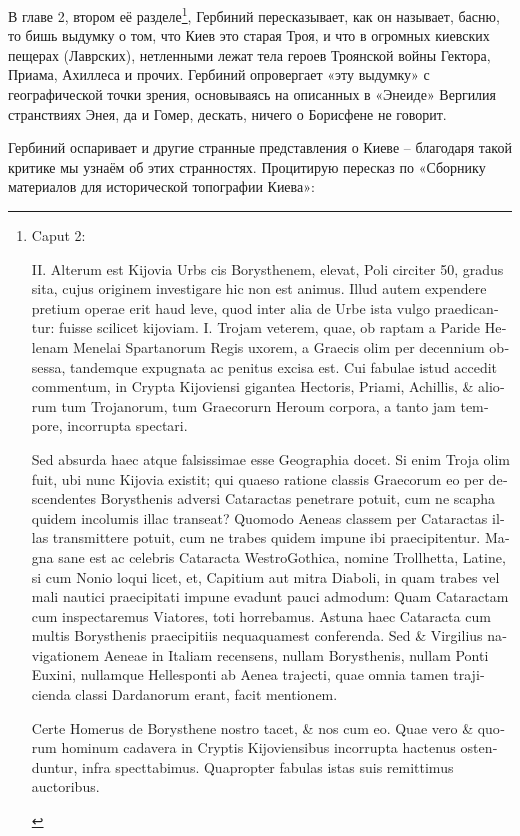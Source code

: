 В главе 2, втором её разделе\footnote{\begin{otherlanguage}{latin}Caput 2:

II.
Alterum est Kijovia Urbs cis Borysthenem, elevat, Poli circiter 50, gradus sita, cujus originem investigare hic non est animus. Illud autem expendere pretium operae erit haud leve, quod inter alia de Urbe ista vulgo praedicantur: fuisse scilicet kijoviam. I. Trojam veterem, quae, ob raptam a Paride Helenam Menelai Spartanorum Regis uxorem, a Graecis olim per decennium obsessa, tandemque expugnata ac penitus excisa est. Cui fabulae istud accedit commentum, in Crypta Kijoviensi gigantea Hectoris, Priami, Achillis, \& aliorum tum Trojanorum, tum Graecorurn Heroum corpora, a tanto jam tempore, incorrupta spectari. 

Sed absurda haec atque falsissimae esse Geographia docet. Si enim Troja olim fuit, ubi nunc Kijovia existit; qui quaeso ratione classis Graecorum eo per descendentes Borysthenis adversi Cataractas penetrare potuit, cum ne scapha quidem incolumis illac transeat? Quomodo Aeneas classem per Cataractas illas transmittere potuit, cum ne trabes quidem impune ibi praecipitentur. Magna sane est ac celebris Cataracta WestroGothica, nomine Trollhetta, Latine, si cum Nonio loqui licet, et, Capitium aut mitra Diaboli, in quam trabes vel mali nautici praecipitati impune evadunt pauci admodum: Quam Cataractam cum inspectaremus Viatores, toti horrebamus. Astuna haec Cataracta cum multis Borysthenis praecipitiis nequaquamest conferenda. Sed \& Virgilius navigationem Aeneae in Italiam recensens, nullam Borysthenis, nullam Ponti Euxini, nullamque Hellesponti ab Aenea trajecti, quae omnia tamen trajicienda classi Dardanorum erant, facit mentionem.

Certe Homerus de Borysthene nostro tacet, \& nos cum eo. Quae vero \& quorum hominum cadavera in Cryptis Kijoviensibus incorrupta hactenus ostenduntur, infra specttabimus. Quapropter fabulas istas suis remittimus auctoribus.\end{otherlanguage}}, Гербиний пересказывает, как он называет, басню, то бишь выдумку о том, что Киев это старая Троя, и что в огромных киевских пещерах (Лаврских), нетленными лежат тела героев Троянской войны Гектора, Приама, Ахиллеса и прочих. Гербиний опровергает «эту выдумку» с географической точки зрения, основываясь на описанных в «Энеиде» Вергилия странствиях Энея, да и Гомер, дескать, ничего о Борисфене не говорит.

Гербиний оспаривает и другие странные представления о Киеве – благодаря такой критике мы узнаём об этих странностях. Процитирую пересказ по «Сборнику материалов для исторической топографии Киева»:

